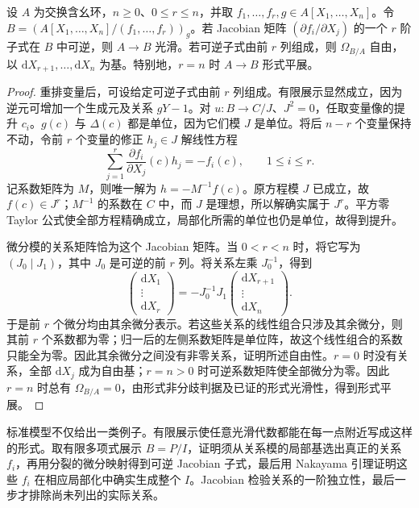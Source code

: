 \begin{proposition}\label{b3:prop:standard-smooth-lifting}
	设 \(A\) 为交换含幺环，\(n\ge0\)、\(0\le r\le n\)，并取 \(f_1,\ldots,f_r,g\in A[X_1,\ldots,X_n]\)。令 \(B=(A[X_1,\ldots,X_n]/(f_1,\ldots,f_r))_g\)。若 Jacobian 矩阵 \((\partial f_i/\partial X_j)\) 的一个 \(r\) 阶子式在 \(B\) 中可逆，则 \(A\to B\) 光滑。若可逆子式由前 \(r\) 列组成，则 \(\Omega_{B/A}\) 自由，以 \(\mathrm{d}X_{r+1},\ldots,\mathrm{d}X_n\) 为基。特别地，\(r=n\) 时 \(A\to B\) 形式平展。
\end{proposition}
\begin{proof}
	重排变量后，可设给定可逆子式由前 \(r\) 列组成。有限展示显然成立，因为逆元可增加一个生成元及关系 \(gY-1\)。对 \(u:B\to C/J\)、\(J^2=0\)，任取变量像的提升 \(c_i\)。\(g(c)\) 与 \(\Delta(c)\) 都是单位，因为它们模 \(J\) 是单位。将后 \(n-r\) 个变量保持不动，令前 \(r\) 个变量的修正 \(h_j\in J\) 解线性方程
	\[
		\sum_{j=1}^r\frac{\partial f_i}{\partial X_j}(c)h_j=-f_i(c), \qquad 1\le i\le r.
	\]
	记系数矩阵为 \(M\)，则唯一解为 \(h=-M^{-1}f(c)\)。原方程模 \(J\) 已成立，故 \(f(c)\in J^r\)；\(M^{-1}\) 的系数在 \(C\) 中，而 \(J\) 是理想，所以解确实属于 \(J^r\)。平方零 Taylor 公式使全部方程精确成立，局部化所需的单位也仍是单位，故得到提升。

	微分模的关系矩阵恰为这个 Jacobian 矩阵。当 \(0<r<n\) 时，将它写为 \((J_0\mid J_1)\)，其中 \(J_0\) 是可逆的前 \(r\) 列。将关系左乘 \(J_0^{-1}\)，得到
	\[
		\begin{pmatrix}\mathrm{d}X_1\\\vdots\\\mathrm{d}X_r\end{pmatrix}
		=-J_0^{-1}J_1
		\begin{pmatrix}\mathrm{d}X_{r+1}\\\vdots\\\mathrm{d}X_n\end{pmatrix}.
	\]
	于是前 \(r\) 个微分均由其余微分表示。若这些关系的线性组合只涉及其余微分，则其前 \(r\) 个系数都为零；归一后的左侧系数矩阵是单位阵，故这个线性组合的系数只能全为零。因此其余微分之间没有非零关系，证明所述自由性。\(r=0\) 时没有关系，全部 \(\mathrm{d}X_j\) 成为自由基；\(r=n>0\) 时可逆系数矩阵使全部微分为零。因此 \(r=n\) 时总有 \(\Omega_{B/A}=0\)，由形式非分歧判据及已证的形式光滑性，得到形式平展。
\end{proof}

标准模型不仅给出一类例子。有限展示使任意光滑代数都能在每一点附近写成这样的形式。取有限多项式展示 \(B=P/I\)，证明须从关系模的局部基选出真正的关系 \(f_i\)，再用分裂的微分映射得到可逆 Jacobian 子式，最后用 Nakayama 引理证明这些 \(f_i\) 在相应局部化中确实生成整个 \(I\)。Jacobian 检验关系的一阶独立性，最后一步才排除尚未列出的实际关系。

